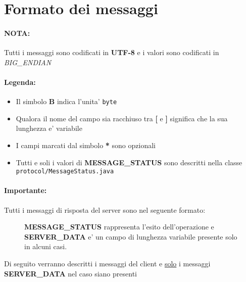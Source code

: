 \section{Formato dei messaggi}
\label{appendix:format}

\paragraph{NOTA:} Tutti i messaggi sono codificati in \textbf{UTF-8} e i valori sono codificati in \emph{BIG\_ENDIAN}
\paragraph{Legenda:}
\begin{itemize}
	\item Il simbolo \textbf{B} indica l'unita' \texttt{byte}
	\item Qualora il nome del campo sia racchiuso tra \textbf{[} e \textbf{]} significa che la sua lunghezza e' variabile
	\item I campi marcati dal simbolo \textbf{*} sono opzionali
	\item Tutti e soli i valori di \textbf{MESSAGE\_STATUS} sono descritti nella classe \texttt{protocol/MessageStatus.java}
\end{itemize}

\paragraph{Importante:} Tutti i messaggi di risposta del server sono nel seguente formato:

\begin{lrbox}{\asciiart}
	\begin{varwidth}{\maxdimen}
		\noindent
	\end{varwidth}
\end{lrbox}%

\begin{center}
	\begin{figure}[h]
		\makebox[\textwidth]{\showasciiart{80ex}}
		\centering \textbf{MESSAGE\_STATUS} rappresenta l'esito dell'operazione e \textbf{SERVER\_DATA} e' un campo di lunghezza variabile presente solo in alcuni casi.
	\end{figure}
\end{center}

Di seguito verranno descritti i messaggi del client e \underline{solo} i messaggi \textbf{SERVER\_DATA} nel caso siano presenti

